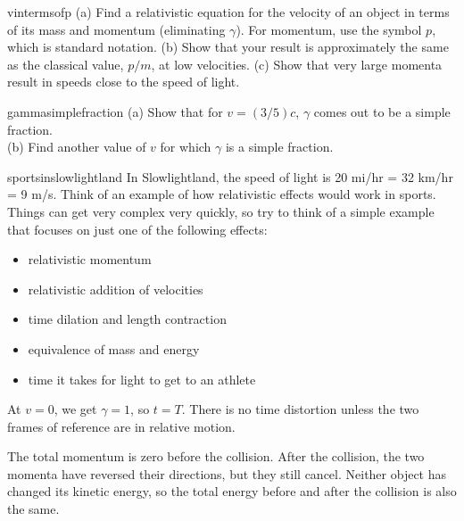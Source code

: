 \begin{hwsection}
\begin{hw}[2]{vintermsofp}
(a) Find a relativistic equation for the velocity of an
object in terms of its mass and momentum (eliminating
$\gamma$). For momentum, use the symbol $p$, which is standard notation. \hwendpart
(b) Show that your result
is approximately the same as the classical value, $p/m$, at
low velocities.\hwendpart
(c) Show that very large momenta result in
speeds close to the speed of light.
\end{hw}

\begin{hw}{gammasimplefraction}
(a) Show that for $v=(3/5)c$, $\gamma$ comes out to be a simple fraction.\\
(b) Find another value of $v$ for which $\gamma$ is a simple fraction.
\end{hw}

\begin{hw}{sportsinslowlightland}
In Slowlightland, the speed of light is 20 mi/hr = 32 km/hr = 9 m/s. Think of an example of how
relativistic effects would work in sports. Things can get very complex very quickly, so try to think of a
simple example that focuses on just one of the following effects:
\begin{itemize}
 \item[] relativistic momentum
 \item[] relativistic addition of velocities
 \item[] time dilation and length contraction
 \item[] equivalence of mass and energy
 \item[] time it takes for light to get to an athlete
\end{itemize}
\end{hw}

\end{hwsection}


 At $v=0$, we get $\gamma=1$, so $t=T$. There is
no time distortion unless the two frames of reference are in relative motion.

 The total momentum is zero before the collision. After the
collision, the two momenta have reversed their directions, but they still cancel.
Neither object has changed its kinetic energy, so the total energy before and after the collision
is also the same.
